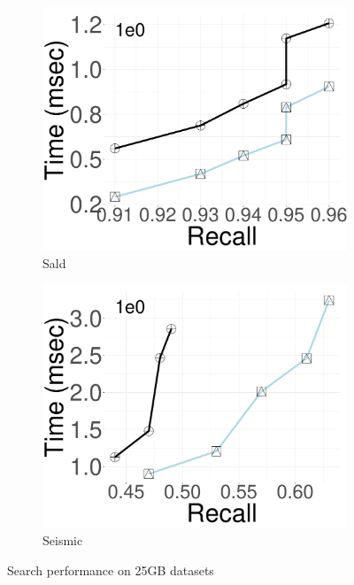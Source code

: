 \begin{figure}[ht]
                        \begin{subfigure}[b]{0.23\textwidth}
            \centering
                \includegraphics[width=\textwidth]{../img/oigas/Search/FINAL25GB/sald/Time.pdf}
                \caption{Sald}
        \label{fig:oigas:search:25:sald}
    \end{subfigure}
            \begin{subfigure}[b]{0.23\textwidth}
            \centering
                \includegraphics[width=\textwidth]{../img/oigas/Search/FINAL25GB/seismic/Time.pdf}
                \caption{Seismic}
        \label{fig:oigas:search:25:Seismic}
    \end{subfigure}
    \caption{Search performance on 25GB datasets}
    \label{fig:oigas:search}
\end{figure}

